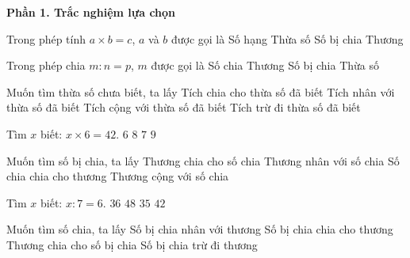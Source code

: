 \textbf{Phần 1. Trắc nghiệm lựa chọn}

\begin{ex} %
Trong phép tính $a \times b = c$, $a$ và $b$ được gọi là
\choice
{Số hạng}
{\True Thừa số}
{Số bị chia}
{Thương}
\end{ex}

\begin{ex} %
Trong phép chia $m : n = p$, $m$ được gọi là
\choice
{Số chia}
{Thương}
{\True Số bị chia}
{Thừa số}
\end{ex}

\begin{ex} %
Muốn tìm thừa số chưa biết, ta lấy
\choice
{\True Tích chia cho thừa số đã biết}
{Tích nhân với thừa số đã biết}
{Tích cộng với thừa số đã biết}
{Tích trừ đi thừa số đã biết}
\end{ex}

\begin{ex} %
Tìm $x$ biết: $x \times 6 = 42$.
\choice
{$6$}
{$8$}
{\True $7$}
{$9$}
\end{ex}

\begin{ex} %
Muốn tìm số bị chia, ta lấy
\choice
{Thương chia cho số chia}
{\True Thương nhân với số chia}
{Số chia chia cho thương}
{Thương cộng với số chia}
\end{ex}

\begin{ex} %
Tìm $x$ biết: $x : 7 = 6$.
\choice
{$36$}
{$48$}
{$35$}
{\True $42$}
\end{ex}

\begin{ex} %
Muốn tìm số chia, ta lấy
\choice
{Số bị chia nhân với thương}
{\True Số bị chia chia cho thương}
{Thương chia cho số bị chia}
{Số bị chia trừ đi thương}
\end{ex}

